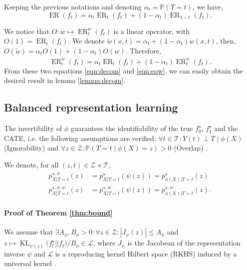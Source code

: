 \documentclass[12pt]{article}
\theoremstyle{plain}
\theoremstyle{definition}
\theoremstyle{remark}
\DeclareMathOperator{\KL}{\text{KL}}
\DeclareMathOperator{\ER}{\text{ER}}
\begin{document}
Keeping the previous notations and denoting $\alpha _{t} =\mathbb P ( T=t)$, we have,
\begin{equation}\label{eqn:decom}
    \ER( f_{t}) =\alpha _{t} \ER_{t}( f_{t}) +( 1-\alpha _{t}) \ER_{1-t}( f_{t}).
\end{equation}

We notice that $O : w \mapsto \ER^{w}_{t}( f_{t})$ is a linear operator, with $O(1)=\ER_{t}( f_{t})$. We denote $\tilde{w}(x,t) =\alpha _{t} +( 1-\alpha _{t})  w(x,t)$, then, $O(\tilde{w})= \alpha_t O(1) + (1-\alpha_t) O(w) $. Therefore,
\begin{equation}\label{eqn:eqw}
    \ \ER^{\tilde{w}}_{t}( f_{t}) =\alpha _{t} \ER_{t}( f_{t}) +( 1-\alpha _{t}) \ER^{w}_{t}( f_{t}).
\end{equation}
From these two equations \ref{eqn:decom} and \ref{eqn:eqw}, we can easily obtain the desired result in lemma \ref{lemma:decom}.


\subsection{Balanced representation learning}\label{app:balancedproof}

The invertibility of $\phi$ guarantees the identifiability of the true $f_0^\star$, $f_1^\star$ and the CATE, i.e. the following assumptions are verified: $ \forall t\in \mathcal{T} : Y(t) \perp T \mid \phi(X) $ (Ignorability) and  $\forall z\in \mathcal{Z}: \mathbb{P}(T=t\mid \phi(X)=z)>0$ (Overlap) \cite{ImbensRecentDI,Pearl2000CausalityMR}.

We denote, for all $(z,t) \in \mathcal{Z} \times \mathcal{T}$,
\begin{align*}
    p^{\star,\phi}_{X | T=t}(z) &=p^\star_{X | T=t}(\psi(z))=p^\star_{\phi(X) | T=t}(z)\\
    p^{\star,\phi,w}_{X | T=t}(z) &=p^{\star,w}_{X | T=t}(\psi(z))=p^{\star,w}_{\phi(X) | T=t}(z).
\end{align*} 

\paragraph{Proof of Theorem \ref{thm:bound} }
We assume that $\exists A_\phi,B_\phi>0 : \forall z \in \mathcal{Z} : |J_{\psi }(z) |\leq A_{\phi }$ and $ z\mapsto\KL_{\psi(z)}\Big( f^{\star}_t ||f_t\Big)/B_{\phi} \in \mathcal{L}$, where $J_{\psi}$ is the Jacobean of the representation inverse $\psi$ and $\mathcal{L}$ is a reproducing kernel Hilbert space (RKHS) induced by a universal kernel \cite{Gretton2012ATest}.
\end{document}
